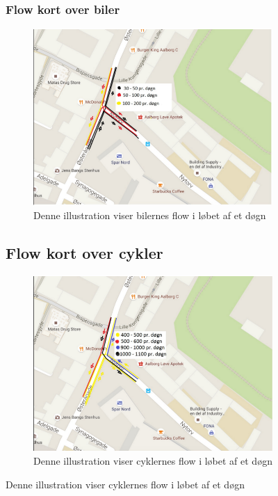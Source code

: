 \begin{figure}[htbp]
\subsubsection{Flow kort over biler}
\begin{figure}[htbp]
   \centering
   \begin{adjustbox}{max width=\textwidth}
     \includegraphics[scale=0.6]{figures/Billederogfigur/bilerflow.jpg}
  \end{adjustbox}
   \caption{Denne illustration viser bilernes flow i løbet af et døgn}
   \label{fig:bilerflow}
 \end{figure}

\subsection{Flow kort over cykler}
\begin{figure}[htbp]
   \centering
   \begin{adjustbox}{max width=\textwidth}
     \includegraphics[scale=0.6]{figures/Billederogfigur/cyklerflow.jpg}
  \end{adjustbox}
   \caption{Denne illustration viser cyklernes flow i løbet af et døgn}
   \label{fig:cyklerflow}
 \end{figure}


\end{figure}
